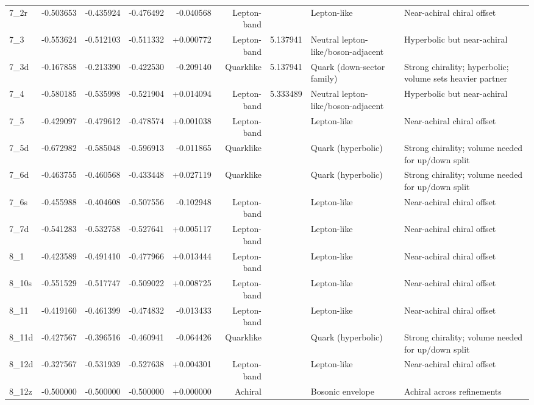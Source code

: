 \documentclass[smallextended]{svjour3}       %
\begin{document}
\begin{longtable}{lrrrrrllp{6.8cm}}
    7\_2r & -0.503653 & -0.435924 & -0.476492 & -0.040568 & Lepton-band &  & Lepton-like & Near-achiral chiral offset \\
    7\_3 & -0.553624 & -0.512103 & -0.511332 & +0.000772 & Lepton-band & 5.137941 & Neutral lepton-like/boson-adjacent & Hyperbolic but near-achiral \\
    7\_3d & -0.167858 & -0.213390 & -0.422530 & -0.209140 & Quarklike & 5.137941 & Quark (down-sector family) & Strong chirality; hyperbolic; volume sets heavier partner \\
    7\_4 & -0.580185 & -0.535998 & -0.521904 & +0.014094 & Lepton-band & 5.333489 & Neutral lepton-like/boson-adjacent & Hyperbolic but near-achiral \\
    7\_5 & -0.429097 & -0.479612 & -0.478574 & +0.001038 & Lepton-band &  & Lepton-like & Near-achiral chiral offset \\
    7\_5d & -0.672982 & -0.585048 & -0.596913 & -0.011865 & Quarklike &  & Quark (hyperbolic) & Strong chirality; volume needed for up/down split \\
    7\_6d & -0.463755 & -0.460568 & -0.433448 & +0.027119 & Quarklike &  & Quark (hyperbolic) & Strong chirality; volume needed for up/down split \\
    7\_6s & -0.455988 & -0.404608 & -0.507556 & -0.102948 & Lepton-band &  & Lepton-like & Near-achiral chiral offset \\
    7\_7d & -0.541283 & -0.532758 & -0.527641 & +0.005117 & Lepton-band &  & Lepton-like & Near-achiral chiral offset \\
    8\_1 & -0.423589 & -0.491410 & -0.477966 & +0.013444 & Lepton-band &  & Lepton-like & Near-achiral chiral offset \\
    8\_10s & -0.551529 & -0.517747 & -0.509022 & +0.008725 & Lepton-band &  & Lepton-like & Near-achiral chiral offset \\
    8\_11 & -0.419160 & -0.461399 & -0.474832 & -0.013433 & Lepton-band &  & Lepton-like & Near-achiral chiral offset \\
    8\_11d & -0.427567 & -0.396516 & -0.460941 & -0.064426 & Quarklike &  & Quark (hyperbolic) & Strong chirality; volume needed for up/down split \\
    8\_12d & -0.327567 & -0.531939 & -0.527638 & +0.004301 & Lepton-band &  & Lepton-like & Near-achiral chiral offset \\
    8\_12z & -0.500000 & -0.500000 & -0.500000 & +0.000000 & Achiral &  & Bosonic envelope & Achiral across refinements \\

\end{longtable}
\end{document}
